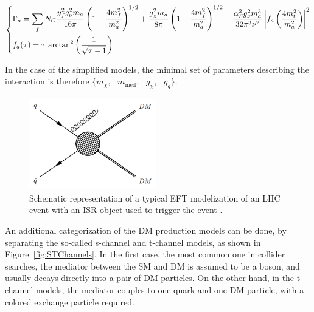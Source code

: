 \documentclass[a4paper, 10pt, openright]{report}
\begin{document}
\begin{itemize}
\begin{equation}
\label{eq:WidthMedPseudo}
\begin{dcases}
\Gamma_{a} = \sum_f N_C \frac{y_f^2 g_\nu^2 m_a}{16 \pi} \left (1- \frac{4 m_f^2}{m_a^2} \right )^{1/2} + \frac{g_\chi^2 m_a}{8 \pi} \left (1- \frac{4 m_f^2}{m_a^2} \right )^{1/2} + \frac{\alpha_S^2 g_\nu^2 m_a^3}{32 \pi^3 \nu^2} \left \lvert f_a \left (\frac{4m_t^2}{m_a^2} \right ) \right \rvert^2 \\
f_a(\tau)= \tau \text{ arctan}^2 \left (\frac{1}{\sqrt{\tau -1}} \right )
\end{dcases}
\end{equation}

In the case of the simplified models, the minimal set of parameters describing the interaction is therefore $\{m_\chi, \text{ } m_{\text{med}}, \text{ } g_\chi, \text{ } g_q \}$.

\begin{figure}[htbp]
\begin{center}
\includegraphics[width=5.5cm, height=4cm]{figs/EFT.png}
\caption{Schematic representation of a typical \ac{EFT} modelization of an \ac{LHC} event with an \ac{ISR} object used to trigger the event \cite{ColliderSearches}.}
\label{fig:EFT}
\end{center}
\end{figure}

\end{itemize}

An additional categorization of the \ac{DM} production models can be done, by separating the so-called s-channel and t-channel models, as shown in Figure~\ref{fig:STChannels}. In the first case, the most common one in collider searches, the mediator between the \ac{SM} and \ac{DM} is assumed to be a boson, and usually decays directly into a pair of \ac{DM} particles. On the other hand, in the t-channel models, the mediator couples to one quark and one \ac{DM} particle, with a colored exchange particle required.
\end{document}
